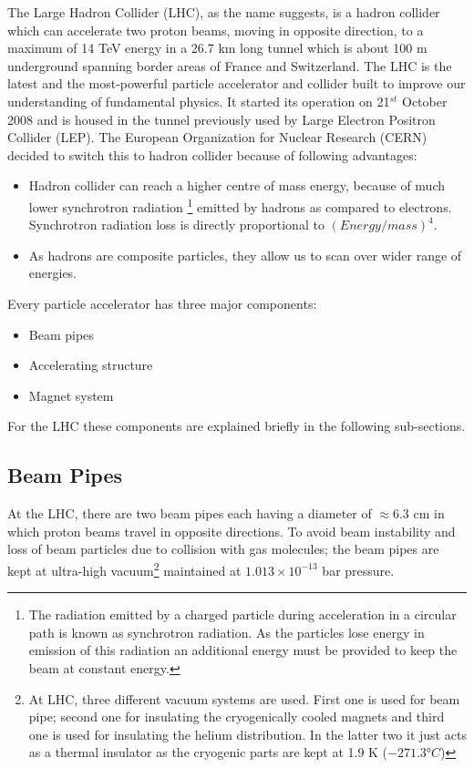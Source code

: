 The Large Hadron Collider (LHC), as the name suggests, is  a hadron collider which can accelerate two proton beams, moving in opposite direction, to a maximum of 14 TeV energy in a 26.7 km long tunnel which is about 100 m underground spanning border areas of France and Switzerland. The LHC is the latest and the most-powerful particle accelerator and collider built to improve our understanding of fundamental physics. It started its operation on 21$^{st}$ October 2008 and is housed in the tunnel previously used by Large Electron Positron Collider (LEP). The European Organization for Nuclear Research (CERN) decided to switch this to hadron collider because of following advantages:
\begin{itemize}
    \item Hadron collider can reach a higher centre of mass energy, because of much lower synchrotron radiation \footnote{The radiation emitted by a charged particle during acceleration in a circular path is known as synchrotron radiation. As the particles lose energy in emission of this radiation an additional energy must be provided to keep the beam at constant energy.} emitted by hadrons as compared to electrons. Synchrotron radiation loss is directly proportional to $(Energy/mass)^4$.
    \item As hadrons are composite particles, they allow us to scan over wider range of energies.
\end{itemize}

Every particle accelerator has three major components:
\begin{itemize}
  \item Beam pipes
  \item Accelerating structure
  \item Magnet system
\end{itemize}
For the LHC these components are explained briefly in the following sub-sections.

\subsection{Beam Pipes} %
\label{sub:beam_pipes}

At the LHC, there are two beam pipes each having a diameter of $\approx$6.3 cm in which proton beams travel in opposite directions. To avoid beam instability and loss of beam particles due to collision with gas molecules; the beam pipes are kept at ultra-high vacuum\footnote{At LHC, three different vacuum systems are used. First one is used for beam pipe; second one for insulating the cryogenically cooled magnets and third one is used for insulating the helium distribution. In the latter two it just acts as a thermal insulator as the cryogenic parts are kept at 1.9 K ($\ang{-271.3}C$)} maintained at $1.013 \times 10^{-13}$ bar pressure.

